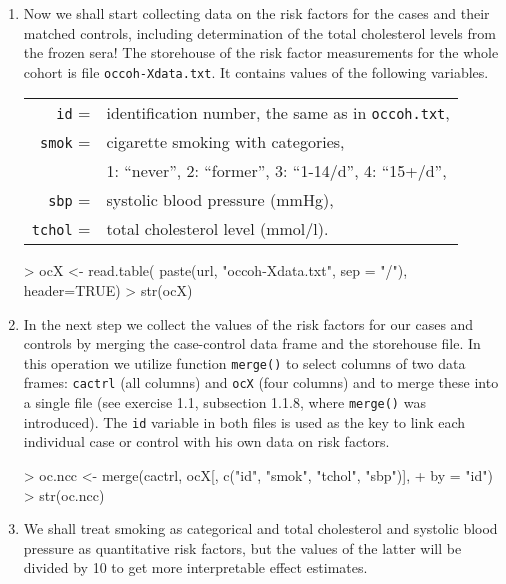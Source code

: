 \begin{enumerate}[resume]
\item
Now we shall start  collecting data on the 
risk factors for the cases and their
matched controls, including determination of the total cholesterol levels from the frozen sera! The storehouse of the risk factor measurements for 
the whole cohort is file {\tt occoh-Xdata.txt}. It contains
values of the following variables.
\begin{center}
\begin{tabular}{r l}
\texttt{id} = & identification number, the same as in {\tt occoh.txt}, \\
\texttt{smok} = &  cigarette smoking with categories, \\
       & 1: ``never'', 2: ``former'', 3: ``1-14/d'', 4: ``15+/d'', \\
\texttt{sbp} = &  systolic blood pressure (mmHg), \\ 
\texttt{tchol} = &  total cholesterol level (mmol/l).
\end{tabular}
\end{center} 

\begin{Schunk}
\begin{Sinput}
> ocX <- read.table( paste(url, "occoh-Xdata.txt", sep = "/"), header=TRUE)
> str(ocX)
\end{Sinput}
\end{Schunk}
 
\item 
In the next step we collect the values of the risk factors
for our cases and controls by merging the case-control data frame and 
the storehouse file. 
In this  operation we utilize function {\tt merge()} to 
select columns of two data frames: {\tt cactrl} 
(all columns) and {\tt ocX} (four columns) and to merge
these into a single file (see exercise 1.1, subsection 1.1.8, where 
\texttt{merge()} was introduced).
 The {\tt id} variable in both files is used as the key to link each
individual case or control with his own data on risk factors.
\begin{Schunk}
\begin{Sinput}
> oc.ncc <- merge(cactrl, ocX[, c("id", "smok", "tchol", "sbp")], 
+    by = "id")
> str(oc.ncc)
\end{Sinput}
\end{Schunk}

\item  
We shall treat smoking as categorical and
 total cholesterol and systolic blood pressure 
as quantitative risk factors, but the values of the
latter will be divided by 10 to get more interpretable effect estimates.


\end{enumerate}
